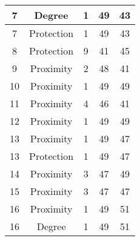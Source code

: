 \documentclass[results.tex]{subfiles}
\begin{document}
\begin{center}
\begin{tabular}{| c || c | c | c | c |}
            \hline
            7                       & Degree                       & 1                      & 49                      & 43                   \\
            \hline
            7                       & Protection                   & 1                      & 49                      & 43                   \\
            \hline
            8                       & Protection                   & 9                      & 41                      & 45                   \\
            \hline
            9                       & Proximity                    & 2                      & 48                      & 41                   \\
            \hline
            10                      & Proximity                    & 1                      & 49                      & 49                   \\
            \hline
            11                      & Proximity                    & 4                      & 46                      & 41                   \\
            \hline
            12                      & Proximity                    & 1                      & 49                      & 49                   \\
            \hline
            13                      & Proximity                    & 1                      & 49                      & 47                   \\
            \hline
            13                      & Protection                   & 1                      & 49                      & 47                   \\
            \hline
            14                      & Proximity                    & 3                      & 47                      & 49                   \\
            \hline
            15                      & Proximity                    & 3                      & 47                      & 47                   \\
            \hline
            16                      & Proximity                    & 1                      & 49                      & 51                   \\
            \hline
            16                      & Degree                       & 1                      & 49                      & 51                   \\

\end{tabular}
\end{center}
\end{document}
